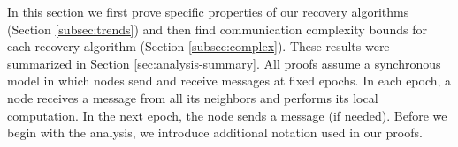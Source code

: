 In this section we first prove specific properties of our recovery algorithms (Section \ref{subsec:trends}) and then find communication complexity bounds for each recovery
algorithm (Section \ref{subsec:complex}). These results were summarized in Section \ref{sec:analysis-summary}.
All proofs assume a synchronous model in which nodes send and receive messages at fixed epochs. 
In each epoch, a node receives a message from all its neighbors and performs its local computation. In the next epoch, the node sends a message (if needed). 
Before we begin with the analysis, we introduce additional notation used in our proofs.


